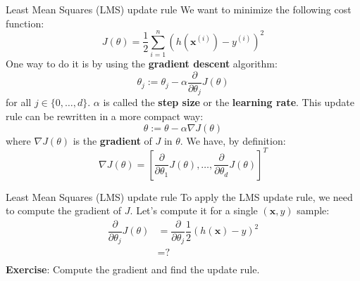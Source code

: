 \documentclass{beamer}
\newcommand{\bxi}{\bm{x}^{(i)}}
\newcommand{\bx}{\bm{x}}
\newcommand{\yi}{y^{(i)}}
\newcommand{\1}[1]{\mathbbm{1}\left[#1\right]}
\begin{document}
\begin{frame}{Least Mean Squares (LMS) update rule}
We want to minimize the following cost function:
\begin{equation*}
J(\theta) = \dfrac{1}{2} \sum_{i = 1}^{n} \left( h\left(\bxi\right) - \yi \right)^2
\end{equation*}
One way to do it is by using the \textbf{gradient descent} algorithm:
\begin{equation*}
\theta_j := \theta_j - \alpha \dfrac{\partial}{\partial \theta_j} J(\theta)
\end{equation*}
for all $j \in \{ 0, \dots, d\}$. $\alpha$ is called the \textbf{step size} or the \textbf{learning rate}. This update rule can be rewritten in a more compact way:
\begin{equation*}
\theta := \theta - \alpha \nabla J(\theta)
\end{equation*}
where $\nabla J(\theta)$ is the \textbf{gradient} of $J$ in $\theta$. We have, by definition:
\begin{equation*}
\nabla J(\theta) = \left[ \dfrac{\partial}{\partial \theta_1} J(\theta), \dots, \dfrac{\partial}{\partial \theta_d} J(\theta) \right]^T
\end{equation*}
\end{frame}

\begin{frame}{Least Mean Squares (LMS) update rule}
To apply the LMS update rule, we need to compute the gradient of $J$. Let's compute it for a single $(\bx, y)$ sample:
\begin{equation*}
\begin{split}
\dfrac{\partial}{\partial \theta_j} J(\theta) & = \dfrac{\partial}{\partial \theta_j} \dfrac{1}{2} \left( h\left(\bx\right) - y \right)^2 \\ 
 & = \text{?} \\
\end{split}
\end{equation*}
\textbf{Exercise}: Compute the gradient and find the update rule.
\end{frame}
\end{document}
